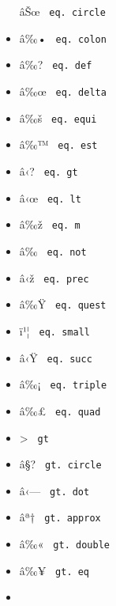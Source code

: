 \begin{itemize}
  \label{symbol-eq.circle}{{ âŠœ }
  \texttt{\ eq.\ circle\ }}
\item
  \label{symbol-eq.colon}{{ â‰• }
  \texttt{\ eq.\ colon\ }}
\item
  \label{symbol-eq.def}{{ â‰? } \texttt{\ eq.\ def\ }}
\item
  \label{symbol-eq.delta}{{ â‰œ }
  \texttt{\ eq.\ delta\ }}
\item
  \label{symbol-eq.equi}{{ â‰š } \texttt{\ eq.\ equi\ }}
\item
  \label{symbol-eq.est}{{ â‰™ } \texttt{\ eq.\ est\ }}
\item
  \label{symbol-eq.gt}{{ â‹? } \texttt{\ eq.\ gt\ }}
\item
  \label{symbol-eq.lt}{{ â‹œ } \texttt{\ eq.\ lt\ }}
\item
  \label{symbol-eq.m}{{ â‰ž } \texttt{\ eq.\ m\ }}
\item
  \label{symbol-eq.not}{{ â‰ } \texttt{\ eq.\ not\ }}
\item
  \label{symbol-eq.prec}{{ â‹ž } \texttt{\ eq.\ prec\ }}
\item
  \label{symbol-eq.quest}{{ â‰Ÿ }
  \texttt{\ eq.\ quest\ }}
\item
  \label{symbol-eq.small}{{ ï¹¦ }
  \texttt{\ eq.\ small\ }}
\item
  \label{symbol-eq.succ}{{ â‹Ÿ } \texttt{\ eq.\ succ\ }}
\item
  \label{symbol-eq.triple}{{ â‰¡ }
  \texttt{\ eq.\ triple\ }}
\item
  \label{symbol-eq.quad}{{ â‰£ } \texttt{\ eq.\ quad\ }}
\item
  \label{symbol-gt}{{ \textgreater{} } \texttt{\ gt\ }}
\item
  \label{symbol-gt.circle}{{ â§? }
  \texttt{\ gt.\ circle\ }}
\item
  \label{symbol-gt.dot}{{ â‹--- } \texttt{\ gt.\ dot\ }}
\item
  \label{symbol-gt.approx}{{ âª† }
  \texttt{\ gt.\ approx\ }}
\item
  \label{symbol-gt.double}{{ â‰« }
  \texttt{\ gt.\ double\ }}
\item
  \label{symbol-gt.eq}{{ â‰¥ } \texttt{\ gt.\ eq\ }}
\item

\end{itemize}
